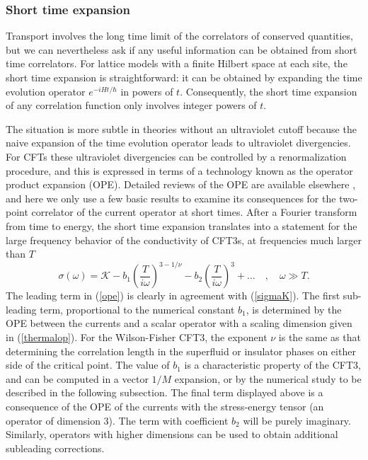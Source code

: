 \documentclass[10pt, oneside]{book}
\def\be{\begin{equation}}
\def\ee{\end{equation}}
\begin{document}
\begin{doublespace}
\subsubsection{Short time expansion}
\label{sec:OPE}

Transport involves the long time limit of the correlators of conserved quantities, but we can nevertheless ask if any useful
information can be obtained from short time correlators. For lattice models with a finite Hilbert space at each site, the short time expansion
is straightforward: it can be obtained by expanding the time evolution operator $e^{-i H t /\hbar}$ in powers of $t$. Consequently, the short time
expansion of any correlation function only involves integer powers of $t$. 

The situation is more subtle in theories without an ultraviolet cutoff because the naive expansion of the time evolution operator leads to ultraviolet divergencies. 
For CFTs these ultraviolet divergencies can be controlled by a renormalization procedure, and this is expressed in terms of a technology
known as the operator product expansion (OPE). Detailed reviews of the OPE are available elsewhere \cite{Rychkov,Rychkov2}, 
and here we only use a few basic results to examine
its consequences for the two-point correlator of the current operator at short times. After a Fourier transform from time to energy, the short time expansion
translates into a statement for the large frequency behavior of the conductivity of CFT3s, at frequencies much larger than $T$ \cite{Katz14}
\be
\sigma (\omega ) = \mathcal{K} - b_1 \left( \frac{T}{i \omega} \right)^{3-1/\nu} - b_2 \left( \frac{T}{i \omega} \right)^3 + \ldots \quad, \quad \omega \gg T.
\label{ope}
\ee
The leading term in (\ref{ope}) is clearly in agreement with (\ref{sigmaK}). The first sub-leading term, proportional to the numerical constant $b_1$, is determined by the OPE between the currents and a scalar operator with a scaling dimension given in (\ref{thermalop}). For the Wilson-Fisher CFT3, 
the exponent $\nu$ is the same as that determining the correlation length in the superfluid or insulator phases on either side of the critical point.
The value of $b_1$ is a characteristic property of the CFT3, and can be computed in a vector $1/M$ expansion, or by the numerical study to be described
in the following subsection. The final term displayed above is a consequence of the OPE of the currents with the stress-energy tensor (an operator of dimension 3). The term with coefficient $b_2$ will be purely imaginary.
Similarly, operators with higher dimensions can be used to obtain additional subleading corrections.


\end{doublespace}
\end{document}
